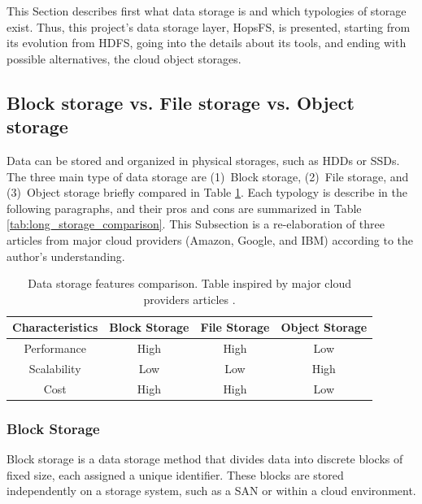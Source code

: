 This Section describes first what data storage is and which typologies of storage exist. Thus, this project's data storage layer, \gls{HopsFS}, is presented, starting from its evolution from \gls{HDFS}, going into the details about its tools, and ending with possible alternatives, the cloud object storages.

\subsection{Block storage vs. File storage vs. Object storage}
\label{subsec:block_vs_file_vs_object}

Data can be stored and organized in physical storages, such as \glspl{HDD} or \glspl{SSD}. The three main type of data storage are (1)~Block storage, (2)~File storage, and (3)~Object storage briefly compared in Table \ref{tab:short_storage_comparison}. Each typology is describe in the following paragraphs, and their pros and cons are summarized in Table \ref{tab:long_storage_comparison}. This Subsection is a re-elaboration of three articles from major cloud providers (Amazon, Google, and IBM) \cite{BlockVsFile, HowObjectVs, ObjectVsFile2021} according to the author's understanding.

\begin{table}[!ht]
    \begin{center}
      \caption[Data storage features comparison]{Data storage features comparison. Table inspired by major cloud providers articles \cite{BlockVsFile,HowObjectVs,ObjectVsFile2021}.}
      \label{tab:short_storage_comparison}
      \begin{tabular}{cccc}
        \toprule
        \textbf{Characteristics} & \textbf{Block Storage} & \textbf{File Storage} & \textbf{Object Storage}\\
        \midrule
        Performance & High & High & Low\\
        Scalability & Low & Low & High\\
        Cost & High & High & Low\\
        \bottomrule
      \end{tabular}
    \end{center}
\end{table}

\subsubsection*{Block Storage}

Block storage is a data storage method that divides data into discrete blocks of fixed size, each assigned a unique identifier. These blocks are stored independently on a storage system, such as a \gls{SAN} or within a cloud environment. 

